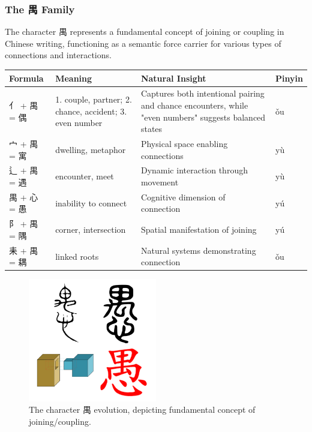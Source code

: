 \documentclass[11pt,letterpaper]{article}
\begin{document}
\subsubsection{The 禺 Family}\label{the-ux79ba-family}

The character 禺 represents a fundamental concept of joining or coupling
in Chinese writing, functioning as a semantic force carrier for various
types of connections and interactions.

\begin{longtable}{|p{3cm}|p{3cm}|p{6cm}|p{2cm}|}
\hline
\textbf{Formula} & \textbf{Meaning} & \textbf{Natural Insight} & \textbf{Pinyin} \\
\hline
亻 + 禺 = 偶 & 1. couple, partner; 2. chance, accident; 3. even number &
Captures both intentional pairing and chance encounters, while "even
numbers" suggests balanced states & ǒu \\
\hline
宀 + 禺 = 寓 & dwelling, metaphor & Physical space enabling connections & yù \\
\hline
辶 + 禺 = 遇 & encounter, meet & Dynamic interaction through movement & yù \\
\hline
禺 + 心 = 愚 & inability to connect & Cognitive dimension of connection & yú \\
\hline
阝 + 禺 = 隅 & corner, intersection & Spatial manifestation of joining & yú \\
\hline
耒 + 禺 = 耦 & linked roots & Natural systems demonstrating connection & ǒu \\
\hline
\end{longtable}

\begin{figure}
\centering
\includegraphics[width=0.5\textwidth]{./images/zi_join.png}
\caption{The character 禺 evolution, depicting fundamental concept of
joining/coupling.}
\end{figure}
\end{document}
